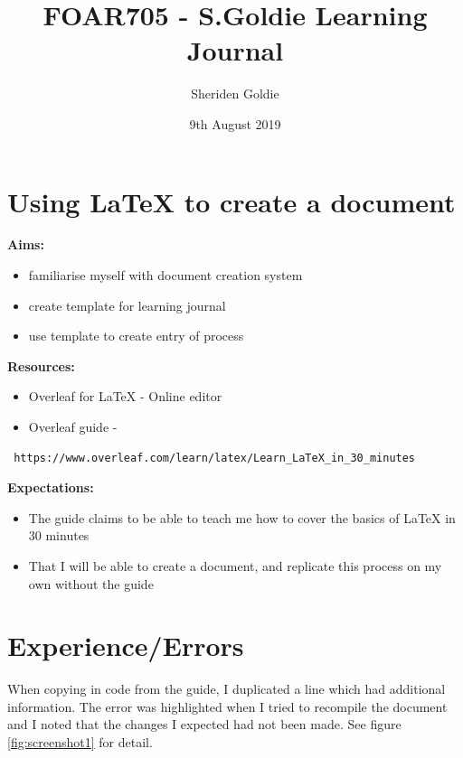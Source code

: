 \documentclass{article}
\title{FOAR705 - S.Goldie Learning Journal}
\author{Sheriden Goldie}
\date{9th August 2019}
\begin{document}
\maketitle

\section*{Using LaTeX to create a document}

\textbf{Aims:}
\begin{itemize}
    \item familiarise myself with document creation system
    \item create template for learning journal
    \item use template to create entry of process
\end{itemize}

\textbf{Resources:}
\begin{itemize}
    \item Overleaf for LaTeX - Online editor
    \item Overleaf guide - 
    \end{itemize}
\begin{verbatim} https://www.overleaf.com/learn/latex/Learn_LaTeX_in_30_minutes \end{verbatim}



\textbf{Expectations:}
\begin{itemize}
    \item The guide claims to be able to teach me how to cover the basics of LaTeX in 30 minutes
    \item That I will be able to create a document, and replicate this process on my own without the guide
\end{itemize}


\section*{Experience/Errors}

When copying in code from the guide, I duplicated a line which had additional information. The error was highlighted when I tried to recompile the document and I noted that the changes I expected had not been made.
See figure \ref{fig:screenshot1} for detail.
\end{document}
